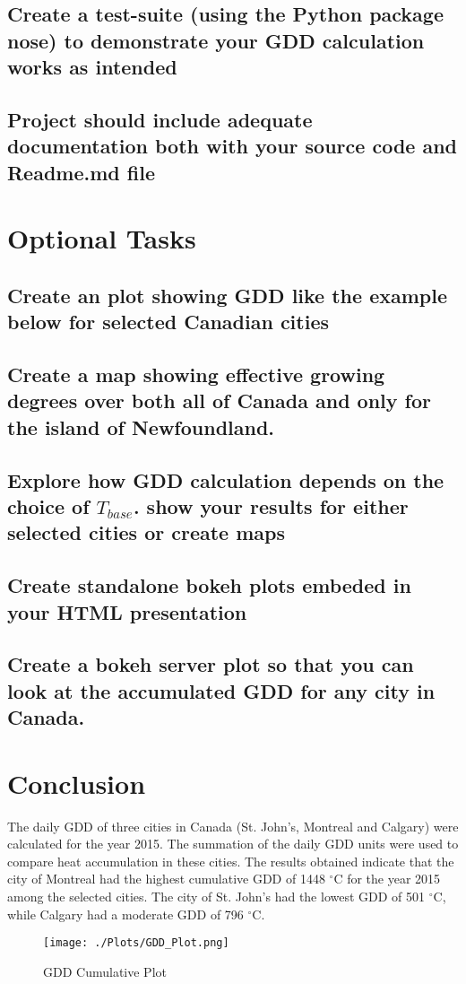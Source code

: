 \documentclass{article}
\begin{document}
\subsection{Create a test-suite (using the Python package nose) to demonstrate your GDD calculation works as intended}
\subsection{Project should include adequate documentation both with your source code and Readme.md file}


\section{ \bf Optional Tasks}
\subsection{Create an plot showing GDD like the example below for selected Canadian cities}
\subsection{Create a map showing effective growing degrees over both all of Canada and only for the island of Newfoundland.}
\subsection{Explore how GDD calculation depends on the choice of $T_{base}$. show your results for either selected cities or create maps}
\subsection{Create standalone bokeh plots embeded in your HTML presentation}
\subsection{Create a bokeh server plot so that you can look at the accumulated GDD for any city in Canada.}



\section{Conclusion}
The daily GDD of three cities in Canada (St. John's, Montreal and Calgary) were calculated for the year 2015. The summation of the daily GDD units were used to compare heat accumulation in these cities. The results obtained indicate that the city of Montreal had the highest cumulative GDD of 1448 $^{\circ}$C for the year 2015 among the selected cities. The city of St. John's had the lowest GDD of 501 $^{\circ}$C, while Calgary had a moderate GDD of 796 $^{\circ}$C.




\begin{figure}[h!]
\centering
\texttt{[image: ./Plots/GDD\_Plot.png]}
\caption{GDD Cumulative Plot}
\label{fig: GDD Plot}
\end{figure}
\end{document}
